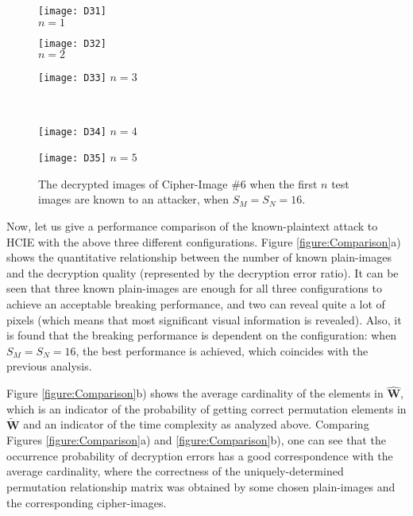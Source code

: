 \documentclass[final,3p,times,twocolumn]{elsarticle}
\newlength\figwidth
\newlength\sfigwidth
\newlength\vfigskip
\begin{document}
\begin{figure}[!htb]
\centering
\begin{minipage}{\sfigwidth}
\centering
\texttt{[image: D31]}\\
$n=1$
\end{minipage}
\begin{minipage}{\sfigwidth}
\centering
\texttt{[image: D32]}\\
$n=2$
\end{minipage}
\begin{minipage}{\sfigwidth}
\centering
\texttt{[image: D33]}
$n=3$
\end{minipage}\\[\vfigskip]
\begin{minipage}{\sfigwidth}
\centering
\texttt{[image: D34]}
$n=4$
\end{minipage}
\begin{minipage}{\sfigwidth}
\centering
\texttt{[image: D35]}
$n=5$
\end{minipage}
\caption{The decrypted images of Cipher-Image \#6 when the first
$n$ test images are known to an attacker, when $S_M=S_N=16$.}
\label{figure:Decrypted16}
\end{figure}

Now, let us give a performance comparison of the
known-plaintext attack to HCIE with the above three different
configurations. Figure \ref{figure:Comparison}a) shows the
quantitative relationship between the number of known plain-images and
the decryption quality (represented by the decryption error
ratio). It can be seen that three known plain-images are enough
for all three configurations to achieve an acceptable breaking
performance, and two can reveal quite a lot of pixels (which means
that most significant visual information is revealed). Also, it is
found that the breaking performance is dependent on the
configuration: when $S_M=S_N=16$, the best performance is
achieved, which coincides with the previous analysis.

Figure \ref{figure:Comparison}b) shows the average cardinality of
the elements in $\widehat{\bm{W}}$, which is an indicator of the
probability of getting correct permutation elements in
$\widetilde{\bm{W}}$ and an indicator of the time complexity as
analyzed above. Comparing Figures \ref{figure:Comparison}a) and
\ref{figure:Comparison}b), one can see that the occurrence
probability of decryption errors has a good correspondence with
the average cardinality, where the correctness of the uniquely-determined permutation relationship matrix
was obtained by some chosen plain-images and the corresponding cipher-images.
\end{document}
